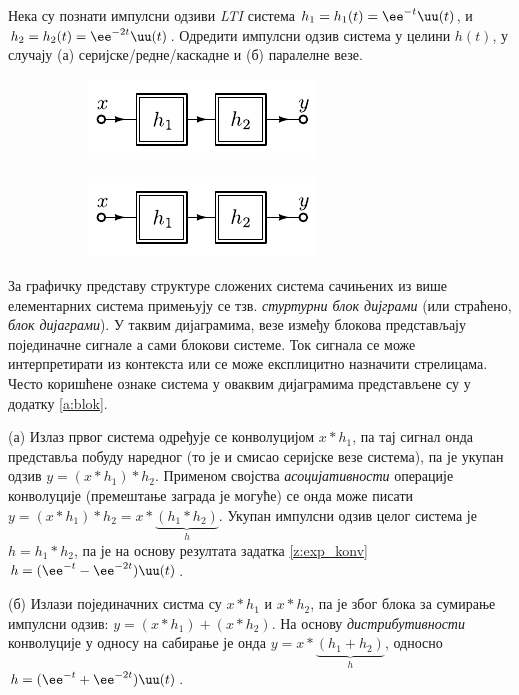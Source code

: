 \PID 
Нека су познати импулсни одзиви \textit{LTI} система 
 $h_1 = h_1(t) = \ee^{-t} \uu(t)$, и $h_2 = h_2(t) = \ee^{-2t} \uu(t)$. Одредити 
импулсни одзив система у целини $h(t)$, у случају (а) серијске/редне/каскадне и (б) паралелне везе. 
\begin{figure}[ht!]
    \begin{subfigure}{0.5\textwidth}
        \centering
        \includegraphics[page=1]{fig/ser_par.pdf}
        \caption{}
    \end{subfigure}
    \begin{subfigure}{0.5\textwidth}
        \centering
        \includegraphics[page=2]{fig/ser_par.pdf}
        \caption{}
    \end{subfigure}
    \caption{}
\end{figure}

\RESENJE

За графичку представу структуре сложених система сачињених из више елементарних система примењују се тзв. \textit{стуртурни блок дијграми}
(или страћено, \textit{блок дијаграми}). У таквим дијаграмима, везе између блокова представљају појединачне сигнале а сами блокови системе.
Ток сигнала се може интерпретирати из контекста или се може експлицитно назначити стрелицама. Често коришћене ознаке система у оваквим дијаграмима 
представљене су у додатку \ref{a:blok}.

(а) Излаз првог система одређује се конволуцијом $x \ast h_1$, па тај сигнал онда представља побуду наредног (то је и смисао серијске везе система), 
па је укупан одзив $y = (x \ast h_1) \ast h_2$. Применом својства \textit{асоцијативности} операције конволуције (премештање заграда је 
могуће) се онда може писати 
$y =(x \ast h_1) \ast h_2 = x \ast \underbrace{( h_1 \ast h_2)}_{h}$. Укупан импулсни одзив целог система је
$h = h_1 \ast h_2$, па је на основу резултата задатка \ref{z:exp_konv} $h = (\ee^{-t} - \ee^{-2t}) \uu(t)$. 

(б) Излази појединачних систма су $x \ast h_1$ и $x \ast h_2$, па је због блока за сумирање импулсни одзив: 
$y = (x \ast h_1) + (x \ast h_2)$. На основу \textit{дистрибутивности} конволуције у односу на сабирање је онда 
$y = x \ast \underbrace{(h_1 + h_2)}_h$, односно $h = (\ee^{-t} + \ee^{-2t}) \uu(t)$.

